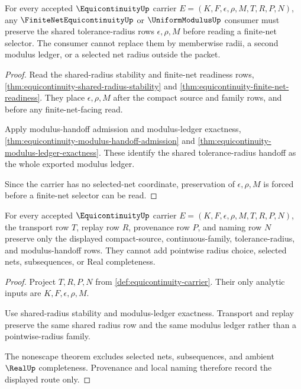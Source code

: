 \begin{theorem}
\label{thm:equicontinuity-shared-modulus-handoff-preservation}
For every accepted $\EquicontinuityUp$ carrier $E=(K,F,\epsilon,\rho,M,T,R,P,N)$, any $\FiniteNetEquicontinuityUp$ or $\UniformModulusUp$ consumer must preserve the shared tolerance-radius rows $\epsilon,\rho,M$ before reading a finite-net selector. The consumer cannot replace them by memberwise radii, a second modulus ledger, or a selected net radius outside the packet.
\end{theorem}
\begin{proof}
Read the shared-radius stability and finite-net readiness rows, \autoref{thm:equicontinuity-shared-radius-stability} and \autoref{thm:equicontinuity-finite-net-readiness}. They place $\epsilon,\rho,M$ after the compact source and family rows, and before any finite-net-facing read.

Apply modulus-handoff admission and modulus-ledger exactness, \autoref{thm:equicontinuity-modulus-handoff-admission} and \autoref{thm:equicontinuity-modulus-ledger-exactness}. These identify the shared tolerance-radius handoff as the whole exported modulus ledger.

Since the carrier has no selected-net coordinate, preservation of $\epsilon,\rho,M$ is forced before a finite-net selector can be read.
\end{proof}

\begin{theorem}
\label{thm:equicontinuity-transport-replay-provenance}
For every accepted $\EquicontinuityUp$ carrier $E=(K,F,\epsilon,\rho,M,T,R,P,N)$, the transport row $T$, replay row $R$, provenance row $P$, and naming row $N$ preserve only the displayed compact-source, continuous-family, tolerance-radius, and modulus-handoff rows. They cannot add pointwise radius choice, selected nets, subsequences, or Real completeness.
\end{theorem}
\begin{proof}
Project $T,R,P,N$ from \autoref{def:equicontinuity-carrier}. Their only analytic inputs are $K,F,\epsilon,\rho,M$.

Use shared-radius stability and modulus-ledger exactness. Transport and replay preserve the same shared radius row and the same modulus ledger rather than a pointwise-radius family.

The nonescape theorem excludes selected nets, subsequences, and ambient $\RealUp$ completeness. Provenance and local naming therefore record the displayed route only.
\end{proof}

